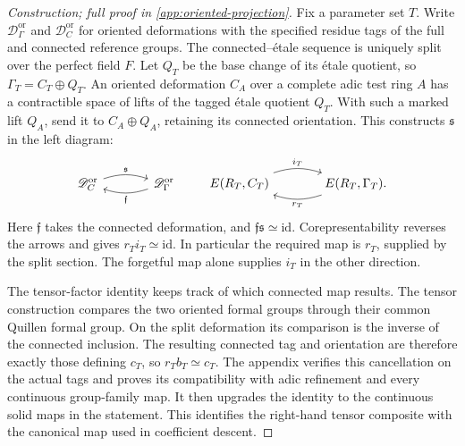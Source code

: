 \documentclass[11pt]{article}
\numberwithin{equation}{section}
\theoremstyle{definition}
\theoremstyle{remark}
\begin{document}
\begin{proof}[Construction; full proof in \cref{app:oriented-projection}]
Fix a parameter set \(T\). Write \(\mathscr D_\Gamma^{\mathrm{or}}\)
and \(\mathscr D_C^{\mathrm{or}}\) for oriented deformations with the
specified residue tags of the full and connected reference groups.
The connected--\'{e}tale sequence is uniquely split over the perfect
field \(F\). Let \(Q_T\) be the base change of its \'{e}tale quotient,
so \(\Gamma_T=C_T\oplus Q_T\). An oriented deformation \(C_A\)
over a complete adic test ring \(A\) has a
contractible space of lifts of the tagged \'{e}tale quotient \(Q_T\).
With such a marked lift \(Q_A\), send it to
\(C_A\oplus Q_A\), retaining its connected orientation. This constructs
\(\mathfrak s\) in the left diagram:
\begin{equation}\label{eq:oriented-section-diagram}
\begin{tikzcd}[column sep=large]
 \mathscr D_C^{\mathrm{or}}
    \arrow[r,bend left=18,"\mathfrak s"]
 &\mathscr D_\Gamma^{\mathrm{or}}
    \arrow[l,bend left=18,"\mathfrak f"]
\end{tikzcd}
\qquad
\begin{tikzcd}[column sep=large]
 E(R_T,C_T)\arrow[r,bend left=18,"i_T"]
 &E(R_T,\Gamma_T)\arrow[l,bend left=18,"r_T"] .
\end{tikzcd}
\end{equation}
Here \(\mathfrak f\) takes the connected deformation, and
\(\mathfrak f\mathfrak s\simeq\mathrm{id}\). Corepresentability
reverses the arrows and gives \(r_Ti_T\simeq\mathrm{id}\).
In particular the required map is \(r_T\), supplied by the split
section. The forgetful map alone supplies \(i_T\) in the other direction.

The tensor-factor identity keeps track of which connected map results.
The tensor construction compares the two oriented formal groups through
their common Quillen formal group. On the split deformation its comparison
is the inverse of the connected inclusion. The resulting connected tag
and orientation are therefore exactly those defining \(c_T\), so
\(r_Tb_T\simeq c_T\). The appendix verifies this cancellation on the
actual tags and proves its compatibility with adic refinement and every
continuous group-family map. It then upgrades the identity to the
continuous solid maps in the statement. This identifies the right-hand
tensor composite with the canonical map used in coefficient descent.
\end{proof}
\end{document}
